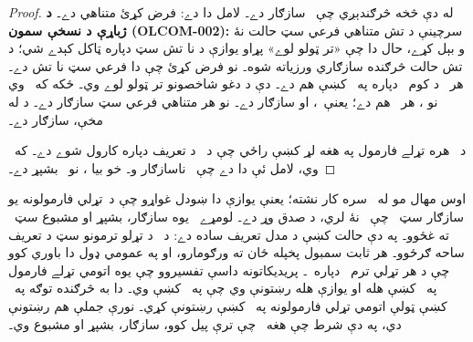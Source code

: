 \documentclass[12pt,a4paper,oneside]{report}
\newcommand{\olfileid}[3]{\gdef\pspart{#1}\gdef\pschapter{#2}\gdef\pssection{#3}}
\gdef\pspart{#2}\gdef\pschapter{#3}\gdef\pssection{}%
\theoremstyle{definition}
\newenvironment{explain}{}{}
\begin{document}
\begin{proof}
\label{olpseg:OLP-0131-B011:start}
له دې څخه څرګندېږي چې~\LR{$\Gamma^*$} سازګار دے۔ لامل دا دے: فرض کړئ
 متناهي دے۔
\textbf{د ژباړې د نسخې سمون (OLCOM-002):} سرچينې د تش متناهي
فرعي سټ حالت نۀ و بېل کړے، حال دا چې «تر ټولو لوے» پړاو يوازې د
نا تش سټ دپاره ټاکل کېدے شي؛ د تش حالت څرګنده سازګاري ورزياته
شوه۔ نو فرض کړئ چې دا فرعي سټ نا تش دے۔ هر~ د
کوم~ دپاره په~ کښې هم دے۔  دې د دغو شاخصونو تر
ټولو لوے وي۔ ځکه که~ وي نو
، هر~ هم
 دے؛ يعنې~، او
 سازګار دے۔ نو هر متناهي فرعي سټ
 سازګار دے۔ د
%
   له مخې، \LR{$\Gamma^*$}
سازګار دے۔
\label{olpseg:OLP-0131-B011:end}

\label{olpseg:OLP-0131-B012:start}
د~\LR{$\Frm[L]$} هره تړلے فارمول په هغه لړ کښې راځي چې د~\LR{$\Gamma^*$}
د تعريف دپاره کارول شوے دے۔ که~ وي، لامل
ئې دا دے چې~ ناسازګار و۔ خو بيا
، نو~\LR{$\Gamma^*$} بشپړ دے۔
\end{proof}
\label{olpseg:OLP-0131-B012:end}

\label{olpseg:OLP-0132-B004:start}
\olfileid{fol}{com}{mod}
\label{olpseg:OLP-0132-B004:end}

\label{olpseg:OLP-0132-B005:start}
\label{olpseg:OLP-0132-B005:end}

\label{olpseg:OLP-0132-B006:start}
\begin{explain}
اوس مهال مو له~\LR{$\eq$} سره کار نشته؛ يعنې يوازې دا ښودل
  غواړو چې د~تړلي فارمولونه يو سازګار سټ~\LR{$\Gamma$} چې~\LR{$\eq$} نۀ لري،
  د صدق وړ دے۔ لومړے~\LR{$\Gamma$} يوه سازګار، بشپړ او مشبوع
  سټ~\LR{$\Gamma^*$} ته غځوو۔ په دې حالت کښې د مدل
   تعريف ساده دے: د~ د تړلو
  ترمونو سټ د تعريف ساحه ګرځوو۔ هر ثابت سمبول پخپله ځان ته
  ورګومارو، او په عمومي ډول دا باوري کوو چې د هر تړلي ترم~
  دپاره~۔ پريديکاتونه داسې تفسيروو
  چې يوه اتومي تړلے فارمول په~ کښې هله او
  يوازې هله رښتونې وي چې په~\LR{$\Gamma^*$} کښې وي۔ دا به څرګنده توګه
  په~\LR{$\Gamma^*$} کښې ټولې اتومي تړلي فارمولونه
  په~ کښې رښتونې کړي۔ نورې جملې هم رښتونې
  دي، په دې شرط چې هغه~\LR{$\Gamma^*$} چې ترې پيل کوو، سازګار، بشپړ او
  مشبوع وي۔
\end{explain}
\label{olpseg:OLP-0132-B006:end}
\end{document}
